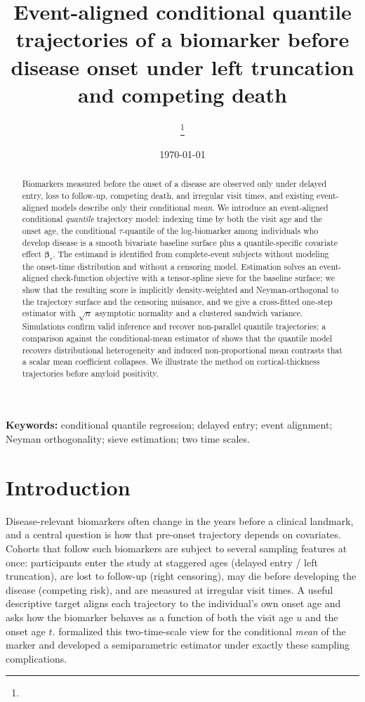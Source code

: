 \documentclass[11pt]{article}
\title{\bf Event-aligned conditional quantile trajectories of a biomarker
before disease onset under left truncation and competing death}
\author{\thanks{}}
\date{\today}
\newcommand{\bbeta}{\bm{\beta}}
\begin{document}
\maketitle

\begin{abstract}
Biomarkers measured before the onset of a disease are observed only under delayed
entry, loss to follow-up, competing death, and irregular visit times, and existing
event-aligned models describe only their conditional \emph{mean}. We introduce an
event-aligned conditional \emph{quantile} trajectory model: indexing time by both
the visit age and the onset age, the conditional $\tau$-quantile of the
log-biomarker among individuals who develop disease is a smooth bivariate baseline
surface plus a quantile-specific covariate effect $\bbeta_{\tau}$. The estimand is
identified from complete-event subjects without modeling the onset-time
distribution and without a censoring model. Estimation solves an event-aligned
check-function objective with a tensor-spline sieve for the baseline surface; we
show that the resulting score is implicitly density-weighted and Neyman-orthogonal
to the trajectory surface and the censoring nuisance, and we give a cross-fitted
one-step estimator with $\sqrt n$ asymptotic normality and a clustered sandwich
variance. Simulations confirm valid inference and recover non-parallel quantile
trajectories; a comparison against the conditional-mean estimator of
\citet{sun2025semiparametric} shows that the quantile model recovers distributional
heterogeneity and induced non-proportional mean contrasts that a scalar mean
coefficient collapses. We illustrate the method on cortical-thickness trajectories
before amyloid positivity.
\end{abstract}

\noindent\textbf{Keywords:} conditional quantile regression; delayed entry;
event alignment; Neyman orthogonality; sieve estimation; two time scales.

\section{Introduction}\label{sec:intro}

Disease-relevant biomarkers often change in the years before a clinical landmark,
and a central question is how that pre-onset trajectory depends on covariates.
Cohorts that follow such biomarkers are subject to several sampling features at
once: participants enter the study at staggered ages (delayed entry / left
truncation), are lost to follow-up (right censoring), may die before developing
the disease (competing risk), and are measured at irregular visit times. A useful
descriptive target aligns each trajectory to the individual's own onset age and
asks how the biomarker behaves as a function of both the visit age $u$ and the
onset age $t$. \citet{sun2025semiparametric} formalized this two-time-scale view
for the conditional \emph{mean} of the marker and developed a semiparametric
estimator under exactly these sampling complications.
\end{document}
